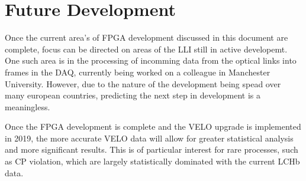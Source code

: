 \section{Future Development}

	Once the current area's of FPGA development discussed in this document are complete, focus can be directed on areas of the LLI still in active developemt.
	One such area is in the processing of incomming data from the optical links into frames in the DAQ, currently being worked on a colleague in Manchester University.
	However, due to the nature of the development being spead over many european countries, predicting the next step in development is a meaningless.
	\par
	Once the FPGA development is complete and the VELO upgrade is implemented in 2019, the more accurate VELO data will allow for greater statistical analysis and more significant results.
	This is of particular interest for rare processes, such as CP violation, which are largely statistically dominated with the current LCHb data.

